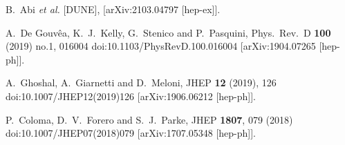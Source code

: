 \begin{thebibliography}{00}
B.~Abi \textit{et al.} [DUNE],
[arXiv:2103.04797 [hep-ex]].

A.~De Gouvêa, K.~J.~Kelly, G.~Stenico and P.~Pasquini,
Phys.\ Rev.\ D \textbf{100} (2019) no.1, 016004
doi:10.1103/PhysRevD.100.016004
[arXiv:1904.07265 [hep-ph]].
  
  
A.~Ghoshal, A.~Giarnetti and D.~Meloni,
JHEP \textbf{12} (2019), 126
doi:10.1007/JHEP12(2019)126
[arXiv:1906.06212 [hep-ph]].

  P.~Coloma, D.~V.~Forero and S.~J.~Parke,
  JHEP {\bf 1807}, 079 (2018)
  doi:10.1007/JHEP07(2018)079
  [arXiv:1707.05348 [hep-ph]].
  
\end{thebibliography}

  
  
  